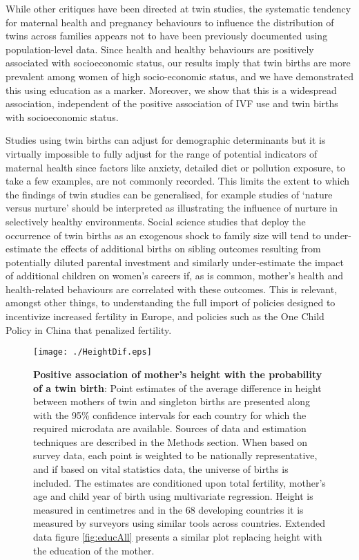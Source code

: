 \documentclass{nature}
\begin{document}
\begin{linenumbers}
While other critiques have been directed at twin studies, the systematic tendency for maternal health and pregnancy behaviours to influence the distribution of twins across families appears not to have been previously documented using population-level data. Since health and healthy behaviours are positively associated with socioeconomic status, our results imply that twin births are more prevalent among women of high socio-economic status, and we have demonstrated this using education as a marker. Moreover, we show that this is a widespread association, independent of the positive association of IVF use and twin births with socioeconomic status.

Studies using twin births can adjust for demographic determinants but it is virtually impossible to fully adjust for the range of potential indicators of maternal health since factors like anxiety, detailed diet or pollution exposure, to take a few examples, are not commonly recorded. This limits the extent to which the findings of twin studies can be generalised, for example studies of `nature versus nurture' should be interpreted as illustrating the influence of nurture in selectively healthy environments. Social science studies that deploy the occurrence of twin births as an exogenous shock to family size will tend to under-estimate the effects of additional births on sibling outcomes resulting from potentially diluted parental investment and similarly under-estimate the impact of additional children on women's careers if, as is common, mother's health and health-related behaviours are correlated with these outcomes. This is relevant, amongst other things, to understanding the full import of policies designed to incentivize increased fertility in Europe, and policies such as the One Child Policy in China that penalized fertility.
\clearpage
\thispagestyle{empty}

\clearpage

\begin{spacing}{1}
\begin{figure}[htpb!]
  \texttt{[image: ./HeightDif.eps]}
\vspace{5mm}
\caption{\textbf{Positive association of mother's height with the probability of a twin birth}: {\footnotesize Point estimates of the average difference in height between mothers of twin and singleton births are presented along with the 95\% confidence intervals for each country for which the required microdata are available. Sources of data and estimation techniques are described in the Methods section. When based on survey data, each point is weighted to be nationally representative, and if based on vital statistics data, the universe of births is included. The estimates are conditioned upon total fertility, mother's age and child year of birth using multivariate regression. Height is measured in centimetres and in the 68 developing countries it is measured by surveyors using similar tools across countries. Extended data figure \ref{fig:educAll} presents a similar plot replacing height with the education of the mother.}}
\label{fig:countryEsts}
\end{figure}



\end{spacing}
\end{linenumbers}
\end{document}
